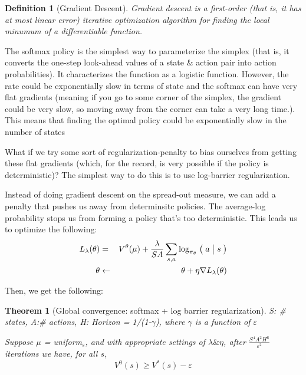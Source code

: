 \documentclass[12pt,reqno]{amsart}
\newtheorem{theorem}{Theorem}[section]
\newtheorem{defn}{Definition}
\newcommand{\Cond}[2]{\bigm( {#1} \bigm\vert {#2}\bigm)}
\newcommand\eps{\varepsilon}
\begin{document}
\begin{shaded}
\begin{defn}[Gradient Descent]
Gradient descent is a first-order (that is, it has at most linear error) iterative optimization algorithm for finding the local minumum of a differentiable function.
\end{defn}
\end{shaded}

The softmax policy is the simplest way to parameterize the simplex (that is, it converts the one-step look-ahead values of a state \& action pair into action probabilities). It characterizes the function as a logistic function. However, the rate could be exponentially slow in terms of state and the softmax can have very flat gradients (meaning if you go to some corner of the simplex, the gradient could be very slow, so moving away from the corner can take a very long time.). This means that finding the optimal policy could be exponentially slow in the number of states

What if we try some sort of regularization-penalty to bias ourselves from getting these flat gradients (which, for the record, is very possible if the policy is deterministic)? The simplest way to do this is to use log-barrier regularization.

Instead of doing gradient descent on the spread-out measure, we can add a penalty that pushes us away from determinsitc policies. The average-log probability stops us from forming a policy that's too deterministic. This leads us to optimize the following:
\begin{eqnarray}
L_\lambda(\theta) &=& V^\theta(\mu) + \frac{\lambda}{SA}\sum\limits_{s,a}\log_{\pi_\theta}\Cond{a}{s}\\
\theta  &\leftarrow& \theta + \eta \nabla L_\lambda(\theta)
\end{eqnarray}

Then, we get the following:
\begin{shaded}
\begin{theorem}[Global convergence: softmax + log barrier regularization]
\par
S: \# states, A:\# actions, H: Horizon = 1/(1-$\gamma$), where $\gamma$ is a function of $\eps$
\par
Suppose $\mu$ = uniform$_{s}$, and with appropriate settings of $\lambda \& \eta$, after $\frac{S^4 A^2 H^6}{\eps^2}$ iterations we have, for all $s$,
\begin{equation}
V^0(s) \geq V^*(s) -\eps
\end{equation}
\end{theorem}
\end{shaded}
\end{document}
